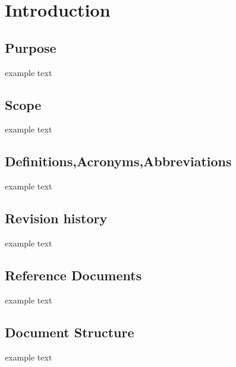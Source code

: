 \section{Introduction}

\subsection{Purpose}
	example text


\subsection{Scope}
	example text


\subsection{Definitions,Acronyms,Abbreviations}
	example text


\subsection{Revision history}
	example text


\subsection{Reference Documents}
	example text


\subsection{Document Structure}
	example text

